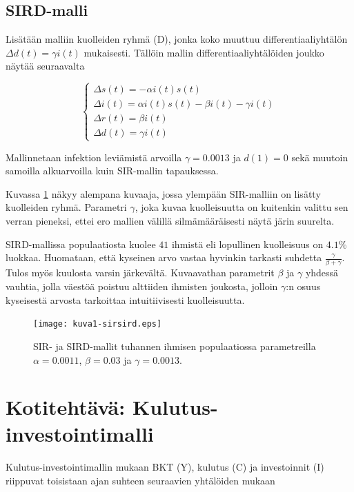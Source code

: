 \documentclass[a4paper,11pt]{article}
\begin{document}
{\subsection{SIRD-malli}

Lisätään malliin kuolleiden ryhmä (D), jonka koko muuttuu differentiaaliyhtälön $\Delta d(t) = \gamma i(t)$ mukaisesti. Tällöin mallin differentiaaliyhtälöiden joukko näytää seuraavalta

\begin{equation}
\begin{cases}
\Delta s(t) = -\alpha i(t) s(t) \\
\Delta i(t) = \alpha i(t) s(t) - \beta i(t) - \gamma i(t) \\
\Delta r(t) = \beta i(t) \\
\Delta d(t) = \gamma i(t)
\end{cases}
\end{equation}

Mallinnetaan infektion leviämistä arvoilla $\gamma = 0.0013$ ja $d(1) = 0$ sekä muutoin samoilla alkuarvoilla kuin SIR-mallin tapauksessa.

Kuvassa \ref{sirsird} näkyy alempana kuvaaja, jossa ylempään SIR-malliin on lisätty kuolleiden ryhmä. Parametri $\gamma$, joka kuvaa kuolleisuutta on kuitenkin valittu sen verran pieneksi, ettei ero mallien välillä silmämääräisesti näytä järin suurelta.

SIRD-mallissa populaatiosta kuolee $41$ ihmistä eli lopullinen kuolleisuus on $4.1\%$ luokkaa. Huomataan, että kyseinen arvo vastaa hyvinkin tarkasti suhdetta $\frac{\gamma}{\beta + \gamma}$. Tulos myös kuulosta varsin järkevältä. Kuvaavathan parametrit $\beta$ ja $\gamma$ yhdessä vauhtia, jolla väestöä poistuu alttiiden ihmisten joukosta, jolloin $\gamma$:n osuus kyseisestä arvosta tarkoittaa intuitiivisesti kuolleisuutta.

\begin{figure}
    \centering
    \texttt{[image: kuva1-sirsird.eps]}
    \caption{SIR- ja SIRD-mallit tuhannen ihmisen populaatiossa parametreilla $\alpha = 0.0011$, $\beta = 0.03$ ja $\gamma = 0.0013$.}
    \label{sirsird}
\end{figure}

\clearpage

\section{Kotitehtävä: Kulutus-investointimalli}

Kulutus-investointimallin mukaan BKT (Y), kulutus (C) ja investoinnit (I) riippuvat toisistaan ajan suhteen seuraavien yhtälöiden mukaan

}
\end{document}
